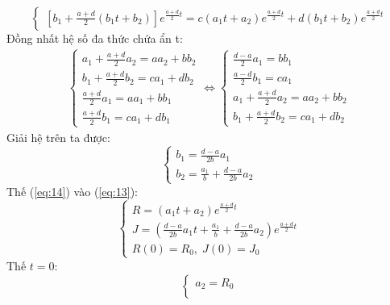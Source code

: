 \documentclass[a4paper]{article}
\begin{document}
\begin{enumerate}
\begin{equation}
\begin{cases}
        \left[b_1 + \frac{a+d}{2}\left(b_1t+b_2\right)\right]e^{\frac{a+d}{2}t} = c(a_1t+a_2)e^{\frac{a+d}{2}t} + d(b_1t+b_2)e^{\frac{a+d}{2}t}
    \end{cases}
    \end{equation}
    Đồng nhất hệ số đa thức chứa ẩn t:
    \begin{equation}
    \begin{split}
        \begin{cases}
        \nonumber
            a_1 + \frac{a+d}{2}a_2 = aa_2 + bb_2 \\[3pt]
            b_1 + \frac{a+d}{2}b_2 = ca_1 + db_2 \\[3pt]
            \frac{a+d}{2}a_1 = aa_1 + bb_1 \\[3pt]
            \frac{a+d}{2}b_1 = ca_1 + db_1
        \end{cases}
        \iff \begin{cases}
            \frac{d-a}{2}a_1 = bb_1 \\[3pt]
            \frac{a-d}{2}b_1 = ca_1 \\[3pt]
            a_1 + \frac{a+d}{2}a_2 = aa_2 + bb_2 \\[3pt]
            b_1 + \frac{a+d}{2}b_2 = ca_1 + db_2 
        \end{cases}
        \end{split}
    \end{equation}
    Giải hệ trên ta được:
    \begin{equation} \label{eq:14}
        \begin{cases}
           b_1 = \frac{d-a}{2b}a_1 \\[3pt]
           b_2 = \frac{a_1}{b}+\frac{d-a}{2b}a_2
        \end{cases}
    \end{equation}
    Thế (\ref{eq:14}) vào (\ref{eq:13}):
    \begin{equation}
        \begin{cases}
            R=(a_1t+a_2)e^{\frac{a+d}{2}t} \\[3pt]
            J= \left(\frac{d-a}{2b}a_1t +\frac{a_1}{b}+\frac{d-a}{2b}a_2 \right)e^{\frac{a+d}{2}t} \\[3pt]
            R(0) = R_0,\;J(0) = J_0
        \end{cases}
    \end{equation}
    Thế $t=0$:
    \begin{equation}
        \begin{cases}
            a_2 = R_0 \\[3pt]

\end{cases}
\end{equation}
\end{enumerate}
\end{document}
